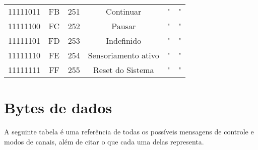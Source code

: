 \begin{center}
\begin{supertabular}{| c | c | c | c | c | c |}
                11111011 & FB & 251 &                 Continuar                       &                 "                    &                   "                  \\
             11111100 & FC & 252 &                  Pausar                         &                 "                    &                   "                  \\
                11111101 & FD & 253 &                 Indefinido                      &                 "                    &                   "                  \\
             11111110 & FE & 254 &             Sensoriamento ativo                 &                 "                    &                   "                  \\
                11111111 & FF & 255 &               Reset do Sistema                  &                 "                    &                   "                  \\
        \end{supertabular}
        \end{center}

    \section{Bytes de dados}

        A seguinte tabela é uma referência de todas os possíveis mensagens de controle e modos de canais, além de citar o que cada uma delas representa.


